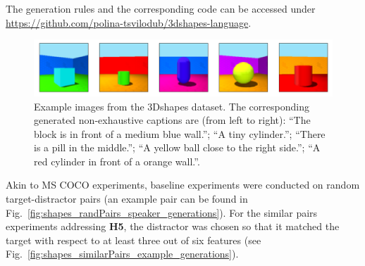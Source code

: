 The generation rules and the corresponding code can be accessed under \url{https://github.com/polina-tsvilodub/3dshapes-language}.

\begin{figure}
	\centering
	\includegraphics[width=\linewidth]{images/3dshapes_example.png}
	\caption{Example images from the 3Dshapes dataset. The corresponding generated non-exhaustive captions are (from left to right): ``The block is in front of a medium blue wall.''; ``A tiny cylinder.''; ``There is a pill in the middle.''; ``A yellow ball close to the right side.''; ``A red cylinder in front of a orange wall.''.}
	\label{fig:3dshapes_example_short}
\end{figure} 

Akin to MS COCO experiments, baseline experiments were conducted on random target-distractor pairs (an example pair can be found in Fig.~\ref{fig:shapes_randPairs_speaker_generations}). For the similar pairs experiments addressing \textbf{H5}, the distractor was chosen so that it matched the target with respect to at least three out of six features (see Fig.~\ref{fig:shapes_similarPairs_example_generations}).%



